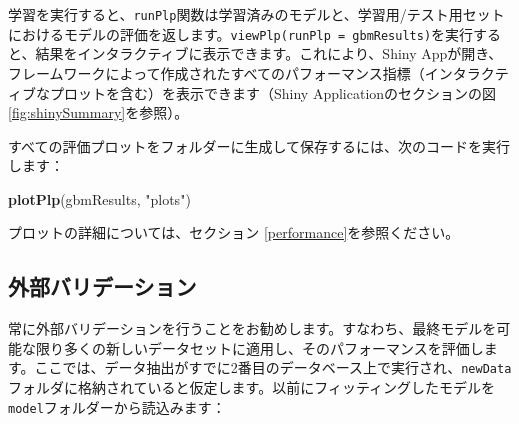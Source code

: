 \documentclass[
  11pt]{book}
\newenvironment{Shaded}{\begin{snugshade}}{\end{snugshade}}
\newcommand{\FunctionTok}[1]{\textcolor[rgb]{0.13,0.29,0.53}{\textbf{#1}}}
\newcommand{\NormalTok}[1]{#1}
\newcommand{\StringTok}[1]{\textcolor[rgb]{0.31,0.60,0.02}{#1}}
\theoremstyle{definition}
\theoremstyle{definition}
\theoremstyle{definition}
\theoremstyle{definition}
\theoremstyle{remark}
\begin{document}
学習を実行すると、\texttt{runPlp}関数は学習済みのモデルと、学習用/テスト用セットにおけるモデルの評価を返します。\texttt{viewPlp(runPlp\ =\ gbmResults)}を実行すると、結果をインタラクティブに表示できます。これにより、Shiny Appが開き、フレームワークによって作成されたすべてのパフォーマンス指標（インタラクティブなプロットを含む）を表示できます（Shiny Applicationのセクションの図 \ref{fig:shinySummary}を参照）。

すべての評価プロットをフォルダーに生成して保存するには、次のコードを実行します：

\begin{Shaded}
\begin{Highlighting}[]
\FunctionTok{plotPlp}\NormalTok{(gbmResults, }\StringTok{"plots"}\NormalTok{)}
\end{Highlighting}
\end{Shaded}

プロットの詳細については、セクション \ref{performance}を参照ください。

\subsection{外部バリデーション}\label{ux5916ux90e8ux30d0ux30eaux30c7ux30fcux30b7ux30e7ux30f3}

常に外部バリデーションを行うことをお勧めします。すなわち、最終モデルを可能な限り多くの新しいデータセットに適用し、そのパフォーマンスを評価します。ここでは、データ抽出がすでに2番目のデータベース上で実行され、\texttt{newData}フォルダに格納されていると仮定します。以前にフィッティングしたモデルを\texttt{model}フォルダーから読込みます：
\end{document}
